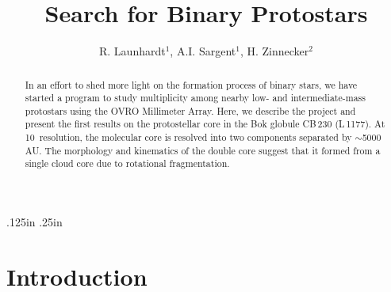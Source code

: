 %
%           
%
\pagestyle{myheadings}
\nofiles


\def\emphasize#1{{\sl#1\/}}
\def\arg#1{{\it#1\/}}
\let\prog=\arg

\def\edcomment#1{\iffalse\marginpar{\raggedright\sl#1\/}\else\relax\fi}
\marginparwidth 1.25in
\marginparsep .125in
\marginparpush .25in
\reversemarginpar
\renewcommand{\floatpagefraction}{0.7}


\title{Search for Binary Protostars}
 \author{R. Launhardt$^1$, A.I. Sargent$^1$, H. Zinnecker$^2$}


\begin{abstract}
In an effort to shed more light on the formation process of binary stars, 
we have started a program to study multiplicity among nearby low- 
and intermediate-mass protostars using the OVRO Millimeter Array.
Here, we describe the 
project and present the first results on the protostellar core in the Bok globule 
CB\,230 (L\,1177). At 10\arcsec\ resolution, the molecular core is resolved 
into two components separated by $\sim$5000\,AU. The morphology 
and kinematics of the double core 
suggest that it formed from a single cloud core 
due to rotational fragmentation.
\end{abstract}

\section{Introduction}

